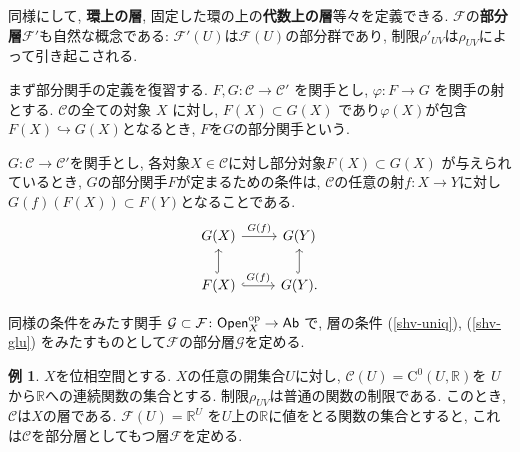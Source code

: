 \documentclass[12pt, a4paper, dvipdfmx]{jsarticle}
\makeatletter
\theoremstyle{definition}
\newtheorem{Example}[Axiom]{例}
\newcommand{\R}{\mathbb{R}}
\newcommand{\F}{\mathcal{F}}
\newcommand{\mcal}{\mathcal}
\newcommand{\pphi}{\varphi}
\newcommand{\inc}{\hookrightarrow}
\numberwithin{equation}{section} %
\newcommand{\op}{{\rm op}} %
\newcommand{\cat}[1]{\textup{\textsf{#1}}}%
\renewenvironment{proof}[1][\proofname]{\par
  \normalfont
  \topsep6\p@\@plus6\p@ \trivlist
  \item[\hskip\labelsep{\textbf{#1}}\@addpunct{\textbf{. }}]\ignorespaces
}{%
  \endtrivlist
}
\renewcommand{\proofname}{証明}
\makeatother
\begin{document}
同様にして, \textbf{環上の層}, 
固定した環の上の\textbf{代数上の層}等々を定義できる. 
$\F$の\textbf{部分層}$\F'$も自然な概念である: 
$\F'(U)$は$\F(U)$の部分群であり, 
制限$\rho'_{UV}$は$\rho_{UV}$によって引き起こされる. 

\begin{proof}[部分層の定義] 
    まず部分関手の定義を復習する. 
    $F,G\colon \mcal{C} \to \mcal{C}'$
    を関手とし, $\pphi \colon F\to G$ を関手の射とする. 
    $\mcal{C}$の全ての対象 $X$ に対し, $F(X)\subset G(X)$
    であり$\pphi(X)$が包含$ F(X)\inc G(X)$となるとき, 
    $F$を$G$の部分関手という. 

    $G\colon \mcal{C}\to\mcal{C}'$を関手とし, 
    各対象$X\in\mcal{C}$に対し部分対象$F(X)\subset G(X)$
    が与えられているとき, $G$の部分関手$F$が定まるための条件は, 
    $\mcal{C}$の任意の射$f\colon X\to Y$に対し
    $G(f)(F(X))\subset F(Y)$となることである. 
    \[\begin{tikzcd}
        G(X) 
        \arrow[r, "G(f)"] 
        &
        G(Y)\\
        F(X)
        \arrow[r,hook, "G(f)"] 
        \arrow[u,hook] 
        &
        G(Y)\arrow[u,hook].
    \end{tikzcd}\]

    同様の条件をみたす関手
    $\mcal{G}\subset\F\colon \cat{Open}_X^{\op}\to\cat{Ab}$
    で, 層の条件 (\ref{shv-uniq}), (\ref{shv-glu}) 
    をみたすものとして$\F$の部分層$\mcal{G}$を定める. 
\end{proof}

\begin{Example}
    $X$を位相空間とする. $X$の任意の開集合$U$に対し, 
    $\mcal{C}(U) = \mathrm{C}^0(U,\R)$を
    $U$から$\R$への連続関数の集合とする. 
    制限$\rho_{UV}$は普通の関数の制限である. 
    このとき, $\mcal{C}$は$X$の層である.
    $\F(U) = \R^U$ を$U$上の$\R$に値をとる関数の集合とすると, 
    これは$\mcal{C}$を部分層としてもつ層$\F$を定める.  
\end{Example}
\end{document}
